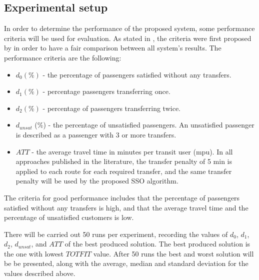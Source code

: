 \subsection{Experimental setup}
\label{subsec:performanceComparison_setup}
In order to determine the performance of the proposed system, some performance criteria will be used for evaluation. As stated in \citet{kechagiopoulos14}, the criteria were first proposed by \citet{chakroborty02} in order to have a fair comparison between all system's results. The performance criteria are %
the following:
\begin{itemize}
\item $d_0 (\%)$ - the percentage of passengers satisfied without any transfers. 
\item $d_1 (\%)$ - percentage passengers transferring once. 
\item $d_2 (\%)$ - percentage of passengers transferring twice. 
\item $d_{unsat}$ (\%) - the percentage of unsatisfied passengers. An unsatisfied passenger is described as a passenger with 3 or more transfers. 
\item $ATT$  - the average travel time in minutes per transit user (mpu). In all approaches published in the literature, the transfer penalty of 5 min is applied to each route for each required transfer, and the same transfer penalty will be used by the proposed SSO algorithm.
\end{itemize}
The criteria for good performance includes that the percentage of passengers satisfied without any transfers is high, and that the average travel time and the percentage of unsatisfied customers is low. 



There will be carried out 50 runs per experiment, recording the values of $d_0$, $d_1$, $d_2$, $d_{unsat}$, and $ATT$ of the best produced solution. The best produced solution is the one with lowest $TOTFIT$ value. After 50 runs the best and worst solution will be be presented, along with the average, median and standard deviation for the values described above. %

